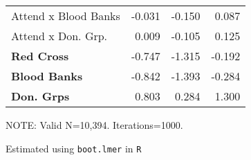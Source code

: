 \begin{table}
\begin{threeparttable}
\begin{tabularx}{4.5in}{X*{3}{d}}
Attend x Blood Banks & -0.031 & -0.150 & 0.087 \\ 
Attend x Don. Grp. & 0.009 & -0.105 & 0.125 \\ 
\textbf{Red Cross} & -0.747 & -1.315 & -0.192 \\  
\textbf{Blood Banks} & -0.842 & -1.393 & -0.284 \\ 
\textbf{Don. Grps} & 0.803 & 0.284 & 1.300 \\
\bottomrule
\end{tabularx}
\begin{tablenotes}
\item \scriptsize{NOTE: Valid N=10,394. Iterations=1000.}
\item \scriptsize{Estimated using \texttt{boot.lmer} in \texttt{R}}
\end{tablenotes}
\end{threeparttable}
\fontsize{10}{15}\selectfont
\end{table}